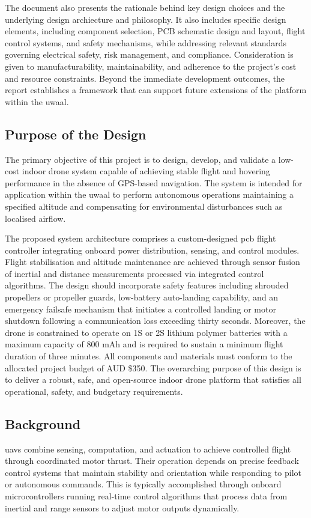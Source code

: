 The document also presents the rationale behind key design choices and the underlying design archiecture and philosophy. It also includes specific design elements, including component selection, PCB schematic design and layout, flight control systems, and safety mechanisms, while addressing relevant standards governing electrical safety, risk management, and compliance. Consideration is given to manufacturability, maintainability, and adherence to the project’s cost and resource constraints. Beyond the immediate development outcomes, the report establishes a framework that can support future extensions of the platform within the \gls{uwaal}.

\subsection{Purpose of the Design}
The primary objective of this project is to design, develop, and validate a low-cost indoor drone system capable of achieving stable flight and hovering performance in the absence of GPS-based navigation. The system is intended for application within the \gls{uwaal} to perform autonomous operations maintaining a specified altitude and compensating for environmental disturbances such as localised airflow. 

The proposed system architecture comprises a custom-designed \gls{pcb} flight controller integrating onboard power distribution, sensing, and control modules. Flight stabilisation and altitude maintenance are achieved through sensor fusion of inertial and distance measurements processed via integrated control algorithms. The design should incorporate safety features including shrouded propellers or propeller guards, low-battery auto-landing capability, and an emergency failsafe mechanism that initiates a controlled landing or motor shutdown following a communication loss exceeding thirty seconds. Moreover, the drone is constrained to operate on 1S or 2S lithium polymer batteries with a maximum capacity of 800 mAh and is required to sustain a minimum flight duration of three minutes. All components and materials must conform to the allocated project budget of AUD \$350. The overarching purpose of this design is to deliver a robust, safe, and open-source indoor drone platform that satisfies all operational, safety, and budgetary requirements. 

\subsection{Background}
\glspl{uav} combine sensing, computation, and actuation to achieve controlled flight through coordinated motor thrust. Their operation depends on precise feedback control systems that maintain stability and orientation while responding to pilot or autonomous commands. This is typically accomplished through onboard microcontrollers running real-time control algorithms that process data from inertial and range sensors to adjust motor outputs dynamically.

